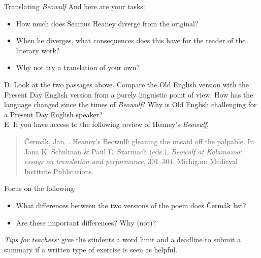 \begin{exercises}{Translating \textit{Beowulf}}
\noindent And here are your tasks:
\begin{itemize}
\item How much does Seamus Heaney diverge from the original?
\item When he diverges, what consequences does this have for the reader of the literary work?
\item Why not try a translation of your own?
\end{itemize}

\noindent D. Look at the two passages above. Compare the Old English version with the Present Day English version from a purely linguistic point of view. How has the language changed since the times of \textit{Beowulf}? Why is Old English challenging for a Present Day English speaker?\\

\noindent E. If you have access to the following review of Heaney's \textit{Beowulf},

\begin{quote}
    Čermák, Jan. \citeyear{Cermak2012}. Heaney's Beowulf: gleaning the unsaid off the palpable. In Jana K. Schulman \& Paul E. Szarmach (eds.), \emph{Beowulf at Kalamazoo: essays on translation and performance}, 301--304. Michigan: Medieval Institute Publications.
\end{quote}

\noindent Focus on the following:
\begin{itemize}
\item What differences between the two versions of the poem does Čermák list? 
\item Are these important differences? Why (not)?
\end{itemize}

\noindent \emph{Tips for teachers:} give the students a word limit and a deadline to submit a summary if a written type of exercise is seen as helpful.

\end{exercises}

